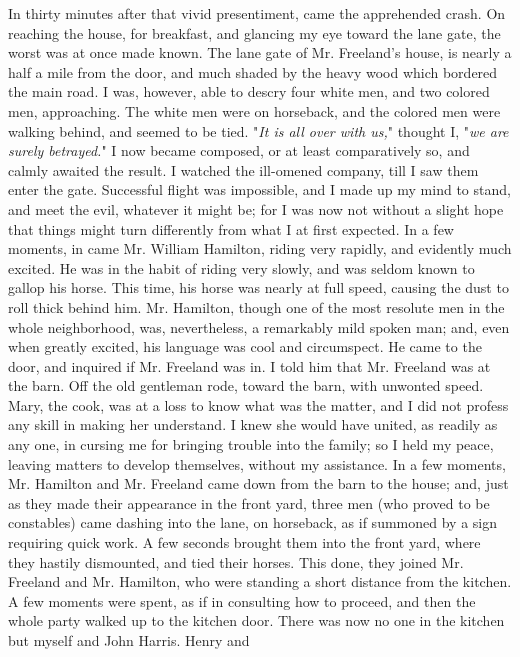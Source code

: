 In thirty minutes after that vivid presentiment, came the apprehended
crash. On reaching the house, for breakfast, and glancing my eye toward
the lane gate, the worst was at once made known. The lane gate of Mr.
Freeland's house, is nearly a half a mile from the door, and much shaded
by the heavy wood which bordered the main road. I was, however, able to
descry four white men, and two colored men, approaching. The white men
were on horseback, and the colored men were walking behind, and seemed
to be tied. "\emph{It is all over with us,}" thought I, "\emph{we are
surely betrayed.}" I now became composed, or at least comparatively so,
and calmly awaited the result. I watched the ill-omened company, till I
saw them enter the gate. Successful flight was impossible, and I made up
my mind to stand, and meet the evil, whatever it might be; for I was now
not without a slight hope that things might turn differently from what I
at first expected. In a few moments, in
{\protect\hypertarget{291}{}{}}came Mr. William Hamilton, riding very
rapidly, and evidently much excited. He was in the habit of riding very
slowly, and was seldom known to gallop his horse. This time, his horse
was nearly at full speed, causing the dust to roll thick behind him. Mr.
Hamilton, though one of the most resolute men in the whole neighborhood,
was, nevertheless, a remarkably mild spoken man; and, even when greatly
excited, his language was cool and circumspect. He came to the door, and
inquired if Mr. Freeland was in. I told him that Mr. Freeland was at the
barn. Off the old gentleman rode, toward the barn, with unwonted speed.
Mary, the cook, was at a loss to know what was the matter, and I did not
profess any skill in making her understand. I knew she would have
united, as readily as any one, in cursing me for bringing trouble into
the family; so I held my peace, leaving matters to develop themselves,
without my assistance. In a few moments, Mr. Hamilton and Mr. Freeland
came down from the barn to the house; and, just as they made their
appearance in the front yard, three men (who proved to be constables)
came dashing into the lane, on horseback, as if summoned by a sign
requiring quick work. A few seconds brought them into the front yard,
where they hastily dismounted, and tied their horses. This done, they
joined Mr. Freeland and Mr. Hamilton, who were standing a short distance
from the kitchen. A few moments were spent, as if in consulting how to
proceed, and then the whole party walked up to the kitchen door. There
was now no one in the kitchen but myself and John Harris. Henry and
